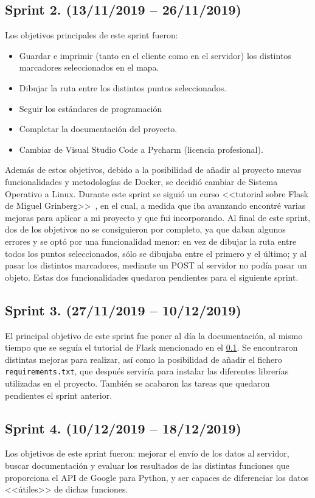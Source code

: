 \subsection{Sprint 2. (13/11/2019 -- 26/11/2019)} \label{sprint2}
Los objetivos principales de este sprint fueron: 
\begin{itemize}
	\item Guardar e imprimir (tanto en el cliente como en el servidor) los distintos marcadores seleccionados en el mapa.
	\item Dibujar la ruta entre los distintos puntos seleccionados.
	\item Seguir los estándares de programación
	\item Completar la documentación del proyecto.
	\item Cambiar de Visual Studio Code a Pycharm (licencia profesional).
\end{itemize}
Además de estos objetivos, debido a la posibilidad de añadir al proyecto nuevas funcionalidades y metodologías de Docker, se decidió cambiar de Sistema Operativo a Linux.
Durante este sprint se siguió un curso <<tutorial sobre Flask de Miguel Grinberg>>~\cite{grinberg-mega}, en el cual, a medida que iba avanzando encontré varias mejoras para aplicar a mi proyecto y que fui incorporando.
Al final de este sprint, dos de los objetivos no se consiguieron por completo, ya que daban algunos errores y se optó por una funcionalidad menor: en vez de dibujar la ruta entre todos los puntos seleccionados, sólo se dibujaba entre el primero y el último; y al pasar los distintos marcadores, mediante un POST al servidor no podía pasar un objeto. Estas dos funcionalidades quedaron pendientes para el siguiente sprint.

\subsection{Sprint 3. (27/11/2019 -- 10/12/2019)}
El principal objetivo de este sprint fue poner al día la documentación, al mismo tiempo que se seguía el tutorial de Flask mencionado en el \ref{sprint2}.
Se encontraron distintas mejoras para realizar, así como la posibilidad de añadir el fichero \texttt{requirements.txt}, que después serviría para instalar las diferentes librerías utilizadas en el proyecto.
También se acabaron las tareas que quedaron pendientes el sprint anterior.

\subsection{Sprint 4. (10/12/2019 -- 18/12/2019)}
Los objetivos de este sprint fueron: mejorar el envío de los datos al servidor, buscar documentación y evaluar los resultados de las distintas funciones que proporciona el API de Google para Python, y ser capaces de diferenciar los datos <<útiles>> de dichas funciones.

